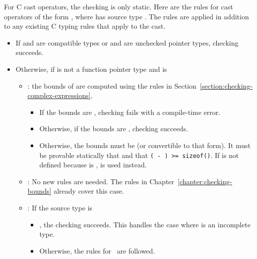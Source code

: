 For C cast operators, the checking is only static.
Here are the rules for cast operators of the form ,
where  has source type .  The rules are applied in addition
to any existing C typing rules that apply to the cast.
\begin{itemize}
\item If  and  are compatible types or  and  are unchecked
pointer types, checking succeeds.
\item Otherwise, if  is not a function pointer type and  is
\begin{itemize}
\item \ptrT: the bounds of  are computed using the rules
in Section~\ref{section:checking-complex-expressions}.
\begin{itemize}
\item If the bounds are \boundsunknown, checking fails with a compile-time
error.
\item Otherwise, if the bounds are \boundsany, checking 
succeeds.
\item Otherwise, the bounds must be  (or convertible
to that form).  It must be provable statically that  \code{>=} 
and that {\texttt{( - ) >= sizeof()}}.
If  is not defined because  is \void,  is
used instead.
\end{itemize}
\item \arrayptrT: No new rules are needed.   The rules in
Chapter~\ref{chapter:checking-bounds} already cover this case.
\item {} \code{*}: If the source type  is
\begin{itemize}
\item \ptrT, the checking succeeds. This handles the case where 
is an incomplete type.
\item Otherwise, the rules for \ptrT\ are followed.
\end{itemize}
\end{itemize}


\end{itemize}
